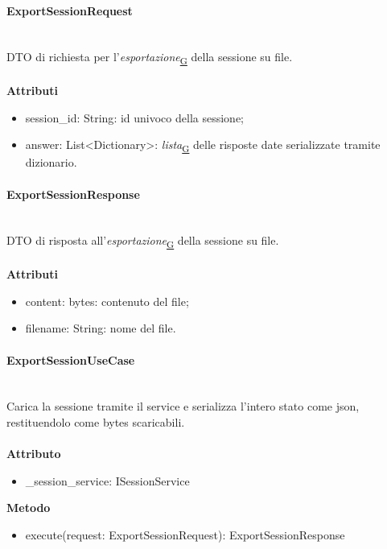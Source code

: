 \documentclass[a4paper,12pt]{article}
\begin{document}
                \paragraph{ExportSessionRequest}\mbox{}\\
                DTO di richiesta per l'\textit{esportazione}\textsubscript{\href{https://atlasteam9.github.io/Atlas/glossario.html\#Esportazione}{G}} della sessione su file.\\\\
                    \textbf{Attributi}
                    \begin{itemize}
                        \item {\ttfamily session\_id: String}: id univoco della sessione;
                        \item {\ttfamily answer: List<Dictionary>}: \textit{lista}\textsubscript{\href{https://atlasteam9.github.io/Atlas/glossario.html\#Lista}{G}} delle risposte date serializzate tramite dizionario.
                    \end{itemize}

                \paragraph{ExportSessionResponse}\mbox{}\\
                    DTO di risposta all'\textit{esportazione}\textsubscript{\href{https://atlasteam9.github.io/Atlas/glossario.html\#Esportazione}{G}} della sessione su file.\\\\
                    \textbf{Attributi}
                    \begin{itemize}
                        \item {\ttfamily content: bytes}: contenuto del file;
                        \item {\ttfamily filename: String}: nome del file.
                    \end{itemize}

                \paragraph{ExportSessionUseCase}\mbox{}\\
                    Carica la sessione tramite il service e serializza l'intero stato come json, restituendolo come bytes scaricabili.\\\\
                    \textbf{Attributo}
                    \begin{itemize}
                        \item {\ttfamily \_session\_service: ISessionService}
                    \end{itemize}
                    \textbf{Metodo}
                    \begin{itemize}
                        \item {\ttfamily execute(request: ExportSessionRequest): ExportSessionResponse}
                    \end{itemize}
\end{document}
